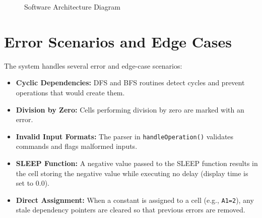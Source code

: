 \documentclass[12pt]{article}
\begin{document}
\begin{figure}[ht]
\centering
{}
\caption{Software Architecture Diagram}
\label{fig:architecture}
\end{figure}

\section{Error Scenarios and Edge Cases}
The system handles several error and edge-case scenarios:
\begin{itemize}[noitemsep]
    \item \textbf{Cyclic Dependencies:} DFS and BFS routines detect cycles and prevent operations that would create them.
    \item \textbf{Division by Zero:} Cells performing division by zero are marked with an error.
    \item \textbf{Invalid Input Formats:} The parser in \texttt{handleOperation()} validates commands and flags malformed inputs.
    \item \textbf{SLEEP Function:} A negative value passed to the SLEEP function results in the cell storing the negative value while executing no delay (display time is set to 0.0).
    \item \textbf{Direct Assignment:} When a constant is assigned to a cell (e.g., \texttt{A1=2}), any stale dependency pointers are cleared so that previous errors are removed.
\end{itemize}
\end{document}
